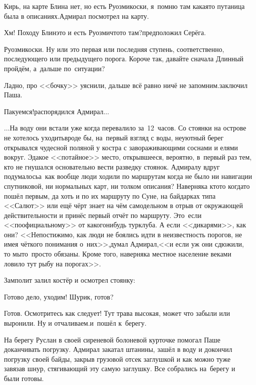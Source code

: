 \diagdash Кирь, на карте Блина нет, но есть Руозмикоски, я~помню там какая\sdash то путаница была в описаниях.\mdash Адмирал посмотрел на карту.

\diagdash Хм! Походу Блин\mdash это и есть Руозми\sdash что\sdash то там?\diagdash предположил Серёга.

\diagdash Руозмикоски. Ну или это первая или последняя ступень, соответственно, последующего или предыдущего порога. Короче так, давайте сначала Длинный пройдём, а~дальше по~ситуации?

\diagdash Ладно, про <<бочку>> уяснили, дальше всё равно ничё не запомним.\mdash заключил Паша.

\diagdash Пакуемся!\mdash распорядился Адмирал$\ldots$

\vspace{0.5cm}
$\ldots$На воду они встали уже когда перевалило за~12~часов. Со стоянки на острове не хотелось уходить\mdash вроде бы, на~первый взгляд с воды, неуютный берег открывался чудесной поляной у костра с завораживающими соснами и елями вокруг. Эдакое <<потайное>> место, открывшееся, вероятно, в~первый раз тем, кто не гнушался основательно вести разведку стоянок. Адмиралу вдруг подумалось\mdash а~как вообще люди ходили по маршрутам когда не было ни навигации спутниковой, ни нормальных карт, ни толком описания? Наверняка кто\sdash то когда\sdash то пошёл первым, да хоть и по их маршруту по Суне, на байдарках типа <<Салют>> или ещё чёрт знает на чём самодельном в отрыв от окружающей действительности и принёс первый отчёт по маршруту. Это~если <<по\sdash официальному>> от какого\sdash нибудь турклуба. А если <<дикарями>>, как они? <<Непостижимо, как люди не боялись идти в неизвестность порогов, не имея чёткого понимания о~них>>,\mdash думал Адмирал,\mdash <<и если уж они сдюжили, то мы\sdash то~просто обязаны. Кроме того, наверняка местное население веками ловило тут рыбу на порогах>>.

Замполит залил костёр и осмотрел стоянку:

\diagdash Готово дело, уходим! Шурик, готов?

\diagdash Готов. Осмотритесь как следует! Тут трава высокая, может что забыли или выронили. Ну и отчаливаем.\mdash и~пошёл к~берегу.

На берегу Руслан в своей сиреневой болоневой курточке помогал Паше доканчивать погрузку. Адмирал закатал штанины, зашёл в воду и докончил погрузку своей байды, закрыв грузовой отсек заглушкой и как можно туже завязав шнур, стягивающий эту самую заглушку. Все собрались на~берегу и были готовы. 

